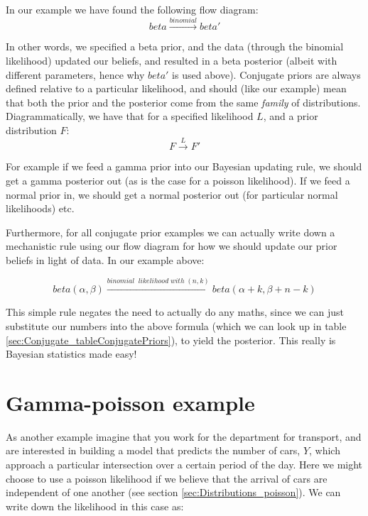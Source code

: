 \documentclass[11pt,fullpage]{book}
\begin{document}
In our example we have found the following flow diagram:
\begin{equation}
beta\xrightarrow{binomial} beta'
\end{equation}

In other words, we specified a beta prior, and the data (through the binomial likelihood) updated our beliefs, and resulted in a beta posterior (albeit with different parameters, hence why $beta'$ is used above). Conjugate priors are always defined relative to a particular likelihood, and should (like our example) mean that both the prior and the posterior come from the same \textit{family} of distributions. Diagrammatically, we have that for a specified likelihood $L$, and a prior distribution $F$:
\begin{equation}
F\xrightarrow{L} F'
\end{equation}

For example if we feed a gamma prior into our Bayesian updating rule, we should get a gamma posterior out (as is the case for a poisson likelihood). If we feed a normal prior in, we should get a normal posterior out (for particular normal likelihoods) etc.

Furthermore, for all conjugate prior examples we can actually write down a mechanistic rule using our flow diagram for how we should update our prior beliefs in light of data. In our example above:

\begin{equation}
beta(\alpha,\beta)\xrightarrow{binomial\;\; likelihood\; with\; (n, k)} beta(\alpha+k,\beta+n-k)
\end{equation}

This simple rule negates the need to actually do any maths, since we can just substitute our numbers into the above formula (which we can look up in table \ref{sec:Conjugate_tableConjugatePriors}), to yield the posterior. This really is Bayesian statistics made easy!

\section{Gamma-poisson example}
As another example imagine that you work for the department for transport, and are interested in building a model that predicts the number of cars, $Y$, which approach a particular intersection over a certain period of the day. Here we might choose to use a poisson likelihood if we believe that the arrival of cars are independent of one another (see section \ref{sec:Distributions_poisson}). We can write down the likelihood in this case as:
\end{document}
